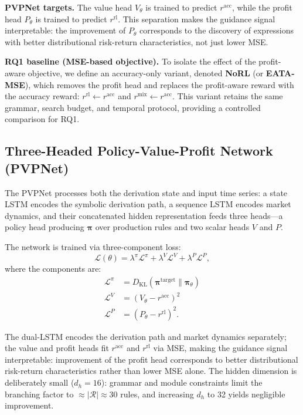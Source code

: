 \textbf{PVPNet targets.} The value head $V_{\theta}$ is trained to predict $r^{\text{acc}}$, while the profit head $P_{\theta}$ is trained to predict $r^{\text{rl}}$. This separation makes the guidance signal interpretable: the improvement of $P_{\theta}$ corresponds to the discovery of expressions with better distributional risk-return characteristics, not just lower MSE.

\textbf{RQ1 baseline (MSE-based objective).} To isolate the effect of the profit-aware objective, we define an accuracy-only variant, denoted \textbf{NoRL} (or \textbf{EATA-MSE}), which removes the profit head and replaces the profit-aware reward with the accuracy reward: $r^{\text{rl}} \leftarrow r^{\text{acc}}$ and $r^{\text{mix}} \leftarrow r^{\text{acc}}$. This variant retains the same grammar, search budget, and temporal protocol, providing a controlled comparison for RQ1.

\subsection{Three-Headed Policy-Value-Profit Network (PVPNet)}
\label{subsec:pvnet}

The PVPNet processes both the derivation state and input time series: a state LSTM encodes the symbolic derivation path, a sequence LSTM encodes market dynamics, and their concatenated hidden representation feeds three heads---a policy head producing $\boldsymbol{\pi}$ over production rules and two scalar heads $V$ and $P$.

The network is trained via three-component loss:
\begin{equation}
\mathcal{L}(\theta) = \lambda^{\pi} \mathcal{L}^{\pi} + \lambda^{V} \mathcal{L}^{V} + \lambda^{P} \mathcal{L}^{P},
\label{eq:loss}
\end{equation}
where the components are:
\begin{align}
\mathcal{L}^{\pi} &= D_{\text{KL}}(\boldsymbol{\pi}^{\text{target}} \| \boldsymbol{\pi}_{\theta}) \label{eq:loss_policy}\\
\mathcal{L}^{V} &= \left(V_{\theta} - r^{\text{acc}}\right)^{2} \label{eq:loss_value}\\
\mathcal{L}^{P} &= \left(P_{\theta} - r^{\text{rl}}\right)^{2}. \label{eq:loss_profit}
\end{align}

The dual-LSTM encodes the derivation path and market dynamics separately; the value and profit heads fit $r^{\text{acc}}$ and $r^{\text{rl}}$ via MSE, making the guidance signal interpretable: improvement of the profit head corresponds to better distributional risk-return characteristics rather than lower MSE alone. The hidden dimension is deliberately small ($d_h=16$): grammar and module constraints limit the branching factor to $\approx |\mathcal{R}| \approx 30$ rules, and increasing $d_h$ to 32 yields negligible improvement.

